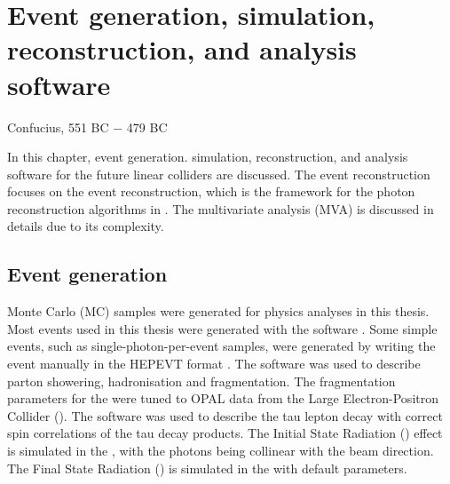 \chapter{Event generation, simulation, reconstruction, and analysis software}
\label{chap:Reconstruction}

%
{Confucius, 551 BC $-$ 479 BC}%





In this chapter, event generation. simulation, reconstruction, and analysis software for the future linear colliders  are discussed. The event reconstruction focuses on the \pandora event reconstruction, which is the framework for the photon reconstruction algorithms in . The multivariate analysis (MVA) is discussed  in details due to its complexity.

\section{Event generation}
\label{sec:pandoraMC}

Monte Carlo (MC) samples were generated for physics analyses in this thesis. Most events used in this thesis were generated with the \WHIZARD software \cite{whizard,Moretti:2001zz}. Some simple events, such as single-photon-per-event samples, were generated by writing the event manually in the  HEPEVT format \cite{Altarelli:1989hx}. The \PYTHIA software \cite{Sjostrand:1995iq} was used to describe parton showering, hadronisation and fragmentation. The fragmentation parameters for the \PYTHIA were tuned to OPAL data \cite{Alexander:1995bk} from the Large Electron-Positron Collider (\LEP). The \TAUOLA software \cite{Jadach:1993hs} was used to describe the tau lepton decay with correct spin correlations of the tau decay products. The Initial State Radiation (\ISR) effect is simulated in the \WHIZARD, with the \ISR photons being collinear with the beam direction. The Final State Radiation (\FSR) is simulated in the \PYTHIA with default parameters.

